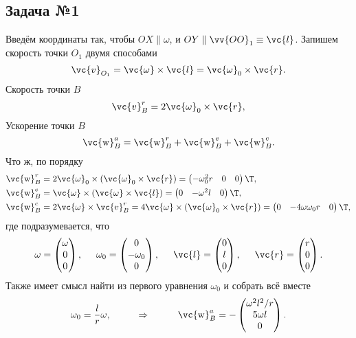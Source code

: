 \subsection*{Задача №1}
Введём координаты так, чтобы $OX \parallel \omega$, и $OY \parallel \vv{OO}_1 \equiv \vc{l}$. Запишем скорость точки $O_1$ двумя способами
\begin{equation}
    \vc{v}_{O_1} = \vc{\omega} \times \vc{l} =
    \vc{\omega}_0 \times \vc{r}.
\end{equation}
Скорость точки $B$
$$
    \vc{v}_B^r = 2 \vc{\omega}_0 \times \vc{r},
$$
Ускорение точки $B$
\begin{equation}
    \vc{\mathrm{w}}_B^a
    =
    \vc{\mathrm{w}}_B^r 
    +
    \vc{\mathrm{w}}_B^e
    +
    \vc{\mathrm{w}}_B^c. 
\end{equation}
Что ж, по порядку
\begin{align*}
    \vc{\mathrm{w}}_B^r  
    &=
    2 \vc{\omega}_0 \times \left(
        \vc{\omega}_0 \times \vc{r}
    \right)
    = 
    \begin{pmatrix}
        - \omega_0^2 r& 0& 0
    \end{pmatrix}\T,
    \\
    \vc{\mathrm{w}}_B^e 
    &=
    \vc{\omega} \times \left(\vc{\omega} \times \vc{l}\right) 
    = 
    \begin{pmatrix}
        0& -\omega^2 l& 0
    \end{pmatrix}\T,
    \\
    \vc{\mathrm{w}}_B^c
    &= 2 \vc{\omega} \times \vc{v}_B^r =
    4 \vc{\omega} \times \left(\vc{\omega}_0 \times \vc{r}\right)
    = 
    \begin{pmatrix}
        0& -4\omega\omega_0 r& 0
    \end{pmatrix}\T,
\end{align*}
где подразумевается, что
$$
    \omega = \begin{pmatrix}
        \omega \\ 0 \\ 0
    \end{pmatrix}, \hspace{0.5cm} 
    \omega_0 = \begin{pmatrix}
        0 \\ -\omega_0 \\ 0
    \end{pmatrix},\hspace{0.5cm} 
    \vc{l} = \begin{pmatrix}
        0 \\ l \\ 0
    \end{pmatrix},\hspace{0.5cm} 
    \vc{r} = \begin{pmatrix}
        r \\ 0 \\ 0
    \end{pmatrix}.
$$
Также имеет смысл найти из первого уравнения ${\omega}_0$ и собрать всё вместе
$$
    \omega_0 = \frac{l}{r} \omega,
    \hspace{1cm} \Rightarrow \hspace{1cm} 
    \vc{\mathrm{w}}_B^a = 
    -
    \begin{pmatrix}
     \omega^2 l^2 / r \\
     5 \omega l \\
     0    
    \end{pmatrix}.
$$
